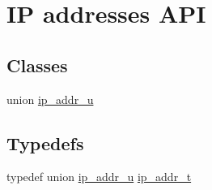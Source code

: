 \hypertarget{group__ur__ipaddr}{}\section{IP addresses A\+PI}
\label{group__ur__ipaddr}
\subsection*{Classes}
\begin{DoxyCompactItemize}
\item 
union \hyperlink{unionip__addr__u}{ip\+\_\+addr\+\_\+u}
\end{DoxyCompactItemize}
\subsection*{Typedefs}
\begin{DoxyCompactItemize}
\item 
typedef union \hyperlink{unionip__addr__u}{ip\+\_\+addr\+\_\+u} \hyperlink{group__ur__ipaddr_ga25f353236a342b23c6eb35f4a87176b5}{ip\+\_\+addr\+\_\+t}
\end{DoxyCompactItemize}
